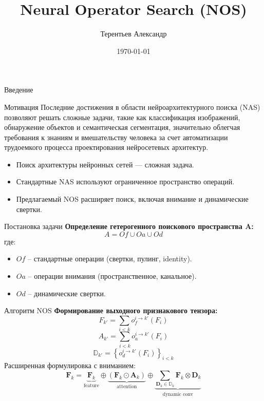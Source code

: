 \documentclass{beamer}
\title{Neural Operator Search (NOS)}
\author{Терентьев Александр}
\date{\today}
\begin{document}
\frame{\titlepage}

\begin{frame}{Введение}
    \begin{block}{Мотивация}
        Последние достижения в области нейроархитектурного поиска (NAS) позволяют решать сложные задачи, такие как классификация изображений, обнаружение объектов и семантическая сегментация, значительно облегчая требования к знаниям и вмешательству человека за счет автоматизации трудоемкого процесса проектирования нейросетевых архитектур.
    \end{block}
    \begin{itemize}
        \item Поиск архитектуры нейронных сетей — сложная задача.
        \item Стандартные NAS используют ограниченное пространство операций.
        \item Предлагаемый NOS расширяет поиск, включая внимание и динамические свертки.
    \end{itemize}
\end{frame}

\begin{frame}{Постановка задачи}
    \textbf{Определение гетерогенного поискового пространства A:}
    \begin{equation}
        A = Of \cup Oa \cup Od
    \end{equation}
    где:
    \begin{itemize}
        \item \( Of \) – стандартные операции (свертки, пулинг, identity).
        \item \( Oa \) – операции внимания (пространственное, канальное).
        \item \( Od \) – динамические свертки.
    \end{itemize}
\end{frame}

\begin{frame}{Алгоритм NOS}
    \textbf{Формирование выходного признакового тензора:}
    \begin{equation}
        F_{k'} = \sum_{i<k} o_{f}^{i \rightarrow k'} (F_i)
    \end{equation}
    \begin{equation}
        A_{k'} = \sum_{i<k} o_{a}^{i \rightarrow k'} (F_i)
    \end{equation}
    \begin{equation}
    \mathbb{D}_{k'} = \left\{ o_{d}^{i \rightarrow k'} (F_i) \right\}_{i<k}
    \end{equation}
    Расширенная формулировка с вниманием:
    \begin{equation}
        \mathbf{F}_k = \underbrace{\mathbf{F}_k}_{\text{feature}} \oplus \underbrace{(\mathbf{F}_k \odot \mathbf{A}_k)}_{\text{attention}} \oplus \underbrace{\sum_{\mathbf{D}_k \in \mathbb{D}_k} \mathbf{F}_k \otimes \mathbf{D}_k}_{\text{dynamic conv}}
    \end{equation}
\end{frame}
\end{document}
